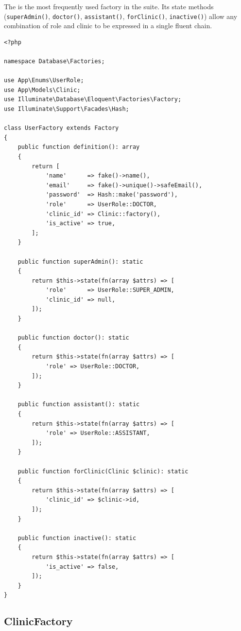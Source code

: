 The  is the most frequently used factory in the
suite. Its state methods (\texttt{superAdmin()}, \texttt{doctor()},
\texttt{assistant()}, \texttt{forClinic()}, \texttt{inactive()}) allow
any combination of role and clinic to be expressed in a single fluent
chain.

\begin{lstlisting}[style=php, caption={\texttt{database/factories/UserFactory.php}
  --- Role and clinic state methods for composable test data.}]
<?php

namespace Database\Factories;

use App\Enums\UserRole;
use App\Models\Clinic;
use Illuminate\Database\Eloquent\Factories\Factory;
use Illuminate\Support\Facades\Hash;

class UserFactory extends Factory
{
    public function definition(): array
    {
        return [
            'name'      => fake()->name(),
            'email'     => fake()->unique()->safeEmail(),
            'password'  => Hash::make('password'),
            'role'      => UserRole::DOCTOR,
            'clinic_id' => Clinic::factory(),
            'is_active' => true,
        ];
    }

    public function superAdmin(): static
    {
        return $this->state(fn(array $attrs) => [
            'role'      => UserRole::SUPER_ADMIN,
            'clinic_id' => null,
        ]);
    }

    public function doctor(): static
    {
        return $this->state(fn(array $attrs) => [
            'role' => UserRole::DOCTOR,
        ]);
    }

    public function assistant(): static
    {
        return $this->state(fn(array $attrs) => [
            'role' => UserRole::ASSISTANT,
        ]);
    }

    public function forClinic(Clinic $clinic): static
    {
        return $this->state(fn(array $attrs) => [
            'clinic_id' => $clinic->id,
        ]);
    }

    public function inactive(): static
    {
        return $this->state(fn(array $attrs) => [
            'is_active' => false,
        ]);
    }
}
\end{lstlisting}

\subsection{ClinicFactory}

